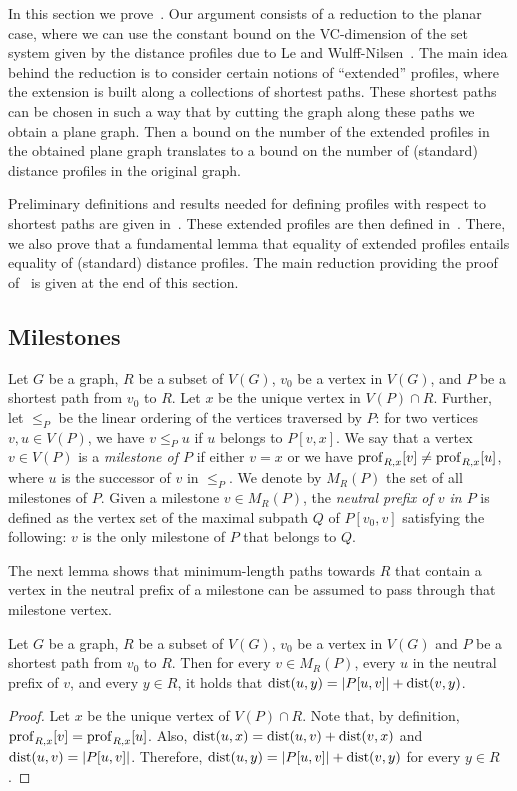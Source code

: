 
In this section we prove~. Our argument consists of a reduction to the planar case, where we can use the constant bound on the VC-dimension of the set system given by the distance profiles due to Le and Wulff-Nilsen~\cite{LeW24}.
The main idea behind the reduction is to consider certain notions of ``extended'' profiles, where the extension is built along a collections of shortest paths. These shortest paths can be chosen in such a way that by cutting the graph along these paths we obtain a plane graph. Then a bound on the number of the extended profiles in the obtained plane graph translates to a bound on the number of (standard) distance profiles in the original graph.

Preliminary definitions and results needed for defining profiles with respect to shortest paths are given in~.
These extended profiles are then defined in~. There, we also prove that a fundamental lemma that equality of extended profiles entails equality of (standard) distance profiles.
The main reduction providing the proof of~ is given at the end of this section.

\subsection{Milestones}
\label{subsec:milestones}

Let $G$ be a graph, $R$ be a subset of $V(G)$,
$v_0$ be a vertex in $V(G)$, and $P$ be a shortest path from $v_0$ to $R$. Let $x$ be the unique vertex in $V(P)\cap R$. Further, let $\le_P$ be the linear ordering of the vertices traversed by $P$: for two vertices $v,u\in V(P)$, we have $v\le_P u$ if $u$ belongs to $P[v,x]$.
We say that a vertex $v\in V(P)$ is a \emph{milestone of $P$}
if either $v=x$ or we have $\mathrm{prof}_{R,x}[v]\neq\mathrm{prof}_{R,x}[u]$, where $u$ is the successor of $v$ in $\le_P$.
We denote by $M_{R}(P)$ the set of all milestones of $P$.
Given a milestone $v\in M_{R}(P)$,
the \emph{neutral prefix of $v$ in $P$} is defined as the vertex set of the maximal subpath $Q$ of $P[v_0,v]$ satisfying the following: $v$ is the only milestone of $P$ that belongs to $Q$.

The next lemma shows that minimum-length paths towards $R$ that contain a vertex in the neutral prefix of a milestone can be assumed to pass through that milestone vertex.

\begin{lemma}
  \label{lem:dispref}
  Let $G$ be a graph, $R$ be a subset of $V(G)$, $v_0$ be a vertex in $V(G)$ and $P$ be a shortest path from $v_0$ to $R$.
  Then for every $v\in M_R(P)$, every $u$ in the neutral prefix of $v$, and every $y\in R$, it holds that
  $\mathrm{dist}(u,y)=|P[u,v]|+\mathrm{dist}(v,y)$. 
\end{lemma}
\begin{proof}
  Let $x$ be the unique vertex of $V(P)\cap R$. Note that, by definition, $\mathrm{prof}_{R,x}[v]=\mathrm{prof}_{R,x}[u]$.
  Also, $\mathrm{dist}(u,x)=\mathrm{dist}(u,v)+\mathrm{dist}(v,x)$ and $\mathrm{dist}(u,v)=|P[u,v]|$. Therefore, $\mathrm{dist}(u,y)=|P[u,v]|+\mathrm{dist}(v,y)$ for every $y\in R$.
\end{proof}

